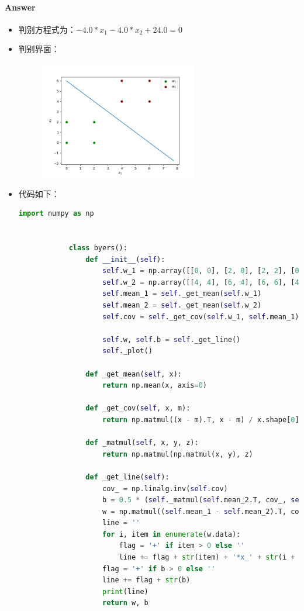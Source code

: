 \documentclass[UTF8,a4paper]{ctexart}
\begin{document}
\paragraph{Answer}
\begin{itemize}
    \item 判别方程式为：$-4.0*x_1-4.0*x_2+24.0 = 0$
    \item 判别界面：
    \begin{figure}[H]
    \centering
    \includegraphics[width = 0.65\textwidth]{myplot.png}
    
    \label{fig:007}
    \end{figure}
    \item 代码如下：

        \begin{lstlisting}[language={Python}]
            import numpy as np


            class byers():
                def __init__(self):
                    self.w_1 = np.array([[0, 0], [2, 0], [2, 2], [0, 2]])
                    self.w_2 = np.array([[4, 4], [6, 4], [6, 6], [4, 6]])
                    self.mean_1 = self._get_mean(self.w_1)
                    self.mean_2 = self._get_mean(self.w_2)
                    self.cov = self._get_cov(self.w_1, self.mean_1)
            
                    self.w, self.b = self._get_line()
                    self._plot()
            
                def _get_mean(self, x):
                    return np.mean(x, axis=0)
            
                def _get_cov(self, x, m):
                    return np.matmul((x - m).T, x - m) / x.shape[0]
            
                def _matmul(self, x, y, z):
                    return np.matmul(np.matmul(x, y), z)
            
                def _get_line(self):
                    cov_ = np.linalg.inv(self.cov)
                    b = 0.5 * (self._matmul(self.mean_2.T, cov_, self.mean_2) - self._matmul(self.mean_1.T, cov_, self.mean_1))
                    w = np.matmul((self.mean_1 - self.mean_2).T, cov_)
                    line = ''
                    for i, item in enumerate(w.data):
                        flag = '+' if item > 0 else ''
                        line += flag + str(item) + '*x_' + str(i + 1)
                    flag = '+' if b > 0 else ''
                    line += flag + str(b)
                    print(line)
                    return w, b
            

\end{lstlisting}
\end{itemize}
\end{document}
